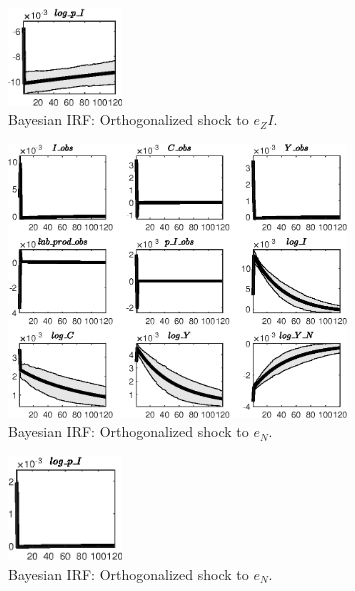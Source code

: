 \begin{figure}[H]
\centering 
\includegraphics[width=0.27\textwidth]{BRS_growth_ext_fd_v1/Output/BRS_growth_ext_fd_v1_Bayesian_IRF_e_ZI_2}
\caption{Bayesian IRF: Orthogonalized shock to ${e_ZI}$.}
\label{Fig:BayesianIRF:e_ZI:2}
\end{figure}
 
\begin{figure}[H]
\centering 
\includegraphics[width=0.80\textwidth]{BRS_growth_ext_fd_v1/Output/BRS_growth_ext_fd_v1_Bayesian_IRF_e_N_1}
\caption{Bayesian IRF: Orthogonalized shock to ${e_N}$.}
\label{Fig:BayesianIRF:e_N:1}
\end{figure}
 
\begin{figure}[H]
\centering 
\includegraphics[width=0.27\textwidth]{BRS_growth_ext_fd_v1/Output/BRS_growth_ext_fd_v1_Bayesian_IRF_e_N_2}
\caption{Bayesian IRF: Orthogonalized shock to ${e_N}$.}
\label{Fig:BayesianIRF:e_N:2}
\end{figure}
 
